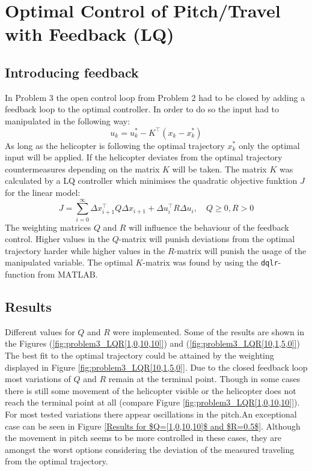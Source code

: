 \section{Optimal Control of Pitch/Travel with Feedback (LQ)}\label{sec:prob3}

\subsection{Introducing feedback}\label{sec:prob31}
In Problem 3 the open control loop from Problem 2 had to be closed by adding a feedback loop to the optimal controller. In order to do so the input had to manipulated in the following way:
\begin{equation}
	u_k=u_k^*-K^\top(x_k-x_k^*)
\end{equation}
As long as the helicopter is following the optimal trajectory $x_k^*$ only the optimal input will be applied. If the helicopter deviates from the optimal trajectory countermeasures depending on the matrix $K$ will be taken. The matrix $K$ was calculated by a LQ controller which minimises the quadratic objective funktion $J$ for the linear model:
\begin{equation}
	J=\displaystyle\sum_{i=0}^{\infty} \Delta x_{i+1}^\top Q \Delta x_{i+1} + \Delta u_i^\top R \Delta u_i, \quad Q \geq 0, R >0
\end{equation}
The weighting matrices $Q$ and $R$ will influence the behaviour of the feedback control. Higher values in the $Q$-matrix will punish deviations from the optimal trajectory harder while higher values in the $R$-matrix will punish the usage of the manipulated variable. The optimal $K$-matrix was found by using the \texttt{dqlr}-function from $\mathrm{MATLAB}$. 
\subsection{Results}\label{sec:prob32}
Different values for $Q$ and $R$ were implemented. Some of the results are shown in the Figures (\ref{fig:problem3_LQR[1,0,10,10]}) and (\ref{fig:problem3_LQR[10,1,5,0]}) \\
The best fit to the optimal trajectory could be attained by the weighting displayed in Figure \ref{fig:problem3_LQR[10,1,5,0]}. Due to the closed feedback loop most variations of $Q$ and $R$ remain at the terminal point. Though in some cases there is still some movement of the helicopter visible or the helicopter does not reach the terminal point at all (compare Figure \ref{fig:problem3_LQR[1,0,10,10]}). For most tested variations there appear oscillations in the pitch.An exceptional case can be seen in Figure \ref{Results for $Q=[1,0,10,10]$ and $R=0.5$}. Although the movement in pitch seems to be more controlled in these cases, they are amongst the worst options considering the deviation of the measured traveling from the optimal trajectory.


